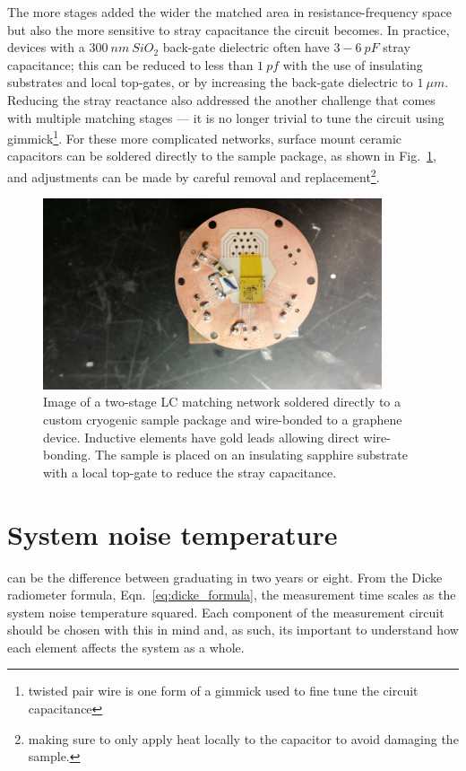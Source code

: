 The more stages added the wider the matched area in resistance-frequency space but also the more sensitive to stray capacitance the circuit becomes. In practice, devices with a $300~nm~SiO_2$ back-gate dielectric often have $3-6~pF$ stray capacitance; this can be reduced to less than $1~pf$ with the use of insulating substrates and local top-gates, or by increasing the back-gate dielectric to $1~\mu m$. Reducing the stray reactance also addressed the another challenge that comes with multiple matching stages --- it is no longer trivial to tune the circuit using gimmick\footnote{twisted pair wire is one form of a gimmick used to fine tune the circuit capacitance}. For these more complicated networks, surface mount ceramic capacitors can be soldered directly to the sample package, as shown in Fig.~\ref{fig:picture_doubleLC}, and adjustments can be made by careful removal and replacement\footnote{making sure to only apply heat locally to the capacitor to avoid damaging the sample.}.
\begin{figure}
\centering
\includegraphics[width = 100mm]{figures/Johnson_noise_thermometry/picture_matching_ceramic}
\caption{Image of a two-stage LC matching network soldered directly to a custom cryogenic sample package and wire-bonded to a graphene device. Inductive elements have gold leads allowing direct wire-bonding. The sample is placed on an insulating sapphire substrate with a local top-gate to reduce the stray capacitance.}
\label{fig:picture_doubleLC}
\end{figure}

\section{System noise temperature}
\label{section:system_noise_temperature}
 can be the difference between graduating in two years or eight. From the Dicke radiometer formula, Eqn.~\ref{eq:dicke_formula}, the measurement time scales as the system noise temperature squared. Each component of the measurement circuit should be chosen with this in mind and, as such, its important to understand how each element affects the system as a whole.

